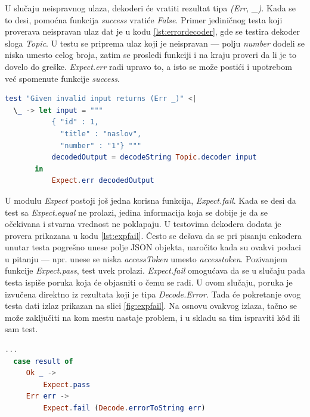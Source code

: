 \documentclass[12pt,oneside]{memoir}
\begin{document}
\par U slučaju neispravnog ulaza, dekoderi će vratiti rezultat tipa \emph{(Err, \_)}. Kada se to desi, pomoćna funkcija \emph{success} vratiće \emph{False}. Primer jediničnog testa koji proverava neispravan ulaz dat je u kodu \ref{lst:errordecoder}, gde se testira dekoder sloga \emph{Topic}. U testu se priprema ulaz koji je neispravan --- polju \emph{number} dodeli se niska umesto celog broja, zatim se prosledi funkciji i na kraju proveri da li je to dovelo do greške. \emph{Expect.err} radi upravo to, a isto se može postići i upotrebom već spomenute funkcije \emph{success}.

\begin{minipage}{\linewidth}
\begin{lstlisting}[language=elm, basicstyle=\small, caption={Implementacija testa koji izaziva grešku na primeru funkcije \emph{Topic.decoder}},captionpos=b, label={lst:errordecoder}]
test "Given invalid input returns (Err _)" <|
  \_ -> let input = """
           { "id" : 1,
             "title" : "naslov",
             "number" : "1"} """
           decodedOutput = decodeString Topic.decoder input
       in 
           Expect.err decodedOutput
\end{lstlisting}
\end{minipage}

\par U modulu \emph{Expect} postoji još jedna korisna funkcija, \emph{Expect.fail}. Kada se desi da test sa \emph{Expect.equal} ne prolazi, jedina informacija koja se dobije je da se očekivana i stvarna vrednost ne poklapaju. U testovima dekodera dodata je provera prikazana u kodu \ref{lst:expfail}. Često se dešava da se pri pisanju enkodera unutar testa pogrešno unese polje JSON objekta, naročito kada su ovakvi podaci u pitanju --- npr. unese se niska \emph{accessToken} umesto \emph{access{\textunderscore}token}. Pozivanjem funkcije \emph{Expect.pass}, test uvek prolazi. \emph{Expect.fail} omogućava da se u slučaju pada testa ispiše poruka koja će objasniti o čemu se radi. U ovom slučaju, poruka je izvučena direktno iz rezultata koji je tipa \emph{Decode.Error}. Tada će pokretanje ovog testa dati izlaz prikazan na slici \ref{fig:expfail}. Na osnovu ovakvog izlaza, tačno se može zaključiti na kom mestu nastaje problem, i u skladu sa tim ispraviti k\^{o}d ili sam test.

\begin{minipage}{\linewidth}
\begin{lstlisting}[language=elm, basicstyle=\small, caption={Implementacija testa koji izbacuje poruku u slučaju da ne prolazi},captionpos=b, label={lst:expfail}]
...
  case result of 
     Ok _ -> 
         Expect.pass
     Err err -> 
         Expect.fail (Decode.errorToString err)
\end{lstlisting}
\end{minipage}
\end{document}
